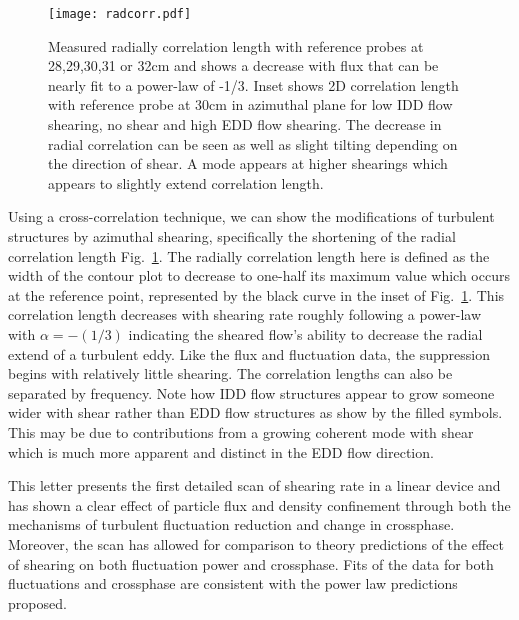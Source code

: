 \documentclass[%
 aps,
 prl,
 amsmath,amssymb,
 reprint,%
]{revtex4-1}
\begin{document}
\begin{figure}
\begin{center}
\texttt{[image: radcorr.pdf]}%
\caption{\label{fig:radcorr} Measured radially correlation length with reference probes at 28,29,30,31 or 32cm and shows a decrease with flux that can be nearly fit to a power-law of -1/3. Inset shows 2D correlation length with reference probe at 30cm in azimuthal plane for low IDD flow shearing, no shear and high EDD flow shearing. The decrease in radial correlation can be seen as well as slight tilting depending on the direction of shear. A mode appears at higher shearings which appears to slightly extend correlation length.}
\end{center}
\end{figure}

Using a cross-correlation technique, we can show the modifications of turbulent structures by azimuthal shearing, specifically the shortening of the radial correlation length Fig.~\ref{fig:radcorr}. The radially correlation length here is defined as the width of the contour plot to decrease to one-half its maximum value which occurs at the reference point, represented by the black curve in the inset of Fig.~\ref{fig:radcorr}. This correlation length decreases with shearing rate roughly following a power-law with $\alpha = -(1/3)$ indicating the sheared flow's ability to decrease the radial extend of a turbulent eddy. Like the flux and fluctuation data, the suppression begins with relatively little shearing. The correlation lengths can also be separated by frequency. Note how IDD flow structures appear to grow someone wider with shear rather than EDD flow structures as show by the filled symbols. This may be due to contributions from a growing coherent mode with shear which is much more apparent and distinct in the EDD flow direction. 

This letter presents the first detailed scan of shearing rate in a linear device and has shown a clear effect of particle flux and density confinement through both the mechanisms of turbulent fluctuation reduction and change in crossphase. Moreover, the scan has allowed for comparison to theory predictions of the effect of shearing on both fluctuation power and crossphase. Fits of the data for both fluctuations and crossphase are consistent with the power law predictions proposed.

\end{document}
